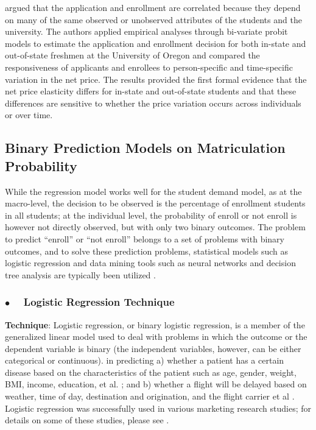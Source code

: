\documentclass[12pt,english]{report}
\begin{document}
\citet{Curs2002} argued that the application and enrollment are correlated
because they depend on many of the same observed or unobserved attributes of
the students and the university.  The authors applied empirical analyses
through bi-variate probit models  to estimate  the application and enrollment
decision for both in-state and out-of-state freshmen at the University of
Oregon and compared the responsiveness of applicants and enrollees to
person-specific and time-specific variation in the net price.   The results
provided the first formal evidence that the net price elasticity differs for
in-state and out-of-state students and that these differences are sensitive to
whether the price variation occurs across individuals or over time.

\subsection{Binary Prediction Models on Matriculation Probability}
While the regression model works well for the student demand model, as at the
macro-level, the decision to be observed is the percentage of enrollment
students in all students;  at the individual level,  the probability of enroll
or not enroll is however not directly observed, but with only two binary
outcomes.  The problem to predict ``enroll'' or ``not enroll'' belongs to a set
of problems with binary outcomes, and to solve these prediction problems,
statistical models such as logistic regression and data mining tools such as
neural networks and decision tree analysis are typically been utilized
\citep{Han2011, James2014}.

\subsubsection{$\bullet \quad$  Logistic Regression Technique}
\textbf{Technique}: Logistic regression, or binary logistic regression, is a
member of the generalized linear model used to deal with problems in which the
outcome or the dependent variable is binary (the independent variables,
however,  can be either categorical or continuous). %
in predicting a) whether a patient has a certain disease based on the
characteristics of the patient such as age, gender, weight, BMI, income,
education, et al.  \citep{Allenby1994}; and b) whether a flight will be delayed
based on weather, time of day, destination and origination, and the flight
carrier et al \citep{Bhat1995}.
Logistic regression was successfully used in various marketing research
studies; for details on some of these studies, please see \citep{Hosmer2013}.
\end{document}
